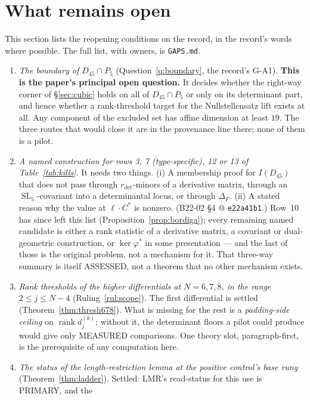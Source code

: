 \documentclass[11pt]{amsart}
\theoremstyle{plain}
\theoremstyle{definition}
\theoremstyle{remark}
\DeclareMathOperator{\SL}{SL}
\DeclareMathOperator{\rank}{rank}
\newcommand{\Dff}{D_{45}}
\newcommand{\Pf}{P_{5}}
\newcommand{\cm}[1]{\texttt{#1}}
\begin{document}
\section{What remains open}\label{sec:open}

This section lists the reopening conditions on the record, in the record's words where possible.
The full list, with owners, is \texttt{GAPS.md}.
\begin{enumerate}
\item \emph{The boundary of $\Dff\cap\Pf$} (Question~\ref{q:boundary}, the record's G-A1).
\textbf{This is the paper's principal open question.} It decides whether the right-way corner of
\S\ref{sec:cubic} holds on all of $\Dff\cap\Pf$ or only on its determinant part, and hence
whether a rank-threshold target for the Nullstellensatz lift exists at all. Any component of the
excluded set has affine dimension at least $19$. The three routes that would close it are in the
provenance line there; none of them is a pilot.
\item \emph{A named construction for rows 3, 7 (type-specific), 12 or 13 of
Table~\ref{tab:kills}.} It needs two things. (i) A membership proof for $I(\Dff)$ that does not
pass through $r_{\det}$-minors of a derivative matrix, through an $\SL_5$-covariant into a
determinantal locus, or through $\Delta_F$. (ii) A stated reason why the value at $\ell\cdot C^*$
is nonzero. (B22-02 \S4 @ \cm{e22a41b1}.) Row~10 has since left this list
(Proposition~\ref{prop:bordiga}); every remaining named candidate is either a rank statistic of a
derivative matrix, a covariant or dual-geometric construction, or $\ker\varphi^*$ in some
presentation --- and the last of those is the original problem, not a mechanism for it. That
three-way summary is itself ASSESSED, not a theorem that no other mechanism exists.
\item \emph{Rank thresholds of the higher differentials at $N=6,7,8$, in the range
$2\le j\le N-4$} (Ruling~\ref{rul:scope}). The first differential is settled
(Theorem~\ref{thm:thresh678}). What is missing for the rest is a \emph{padding-side ceiling} on
$\rank d_j^{(k)}$; without it, the determinant floors a pilot could produce would give only
MEASURED comparisons. One theory slot, paragraph-first, is the prerequisite of any computation
here.
\item \emph{The status of the length-restriction lemma at the positive control's base rung}
(Theorem~\ref{thm:ladder}). Settled: LMR's read-status for this use is PRIMARY, and the

\end{enumerate}
\end{document}
